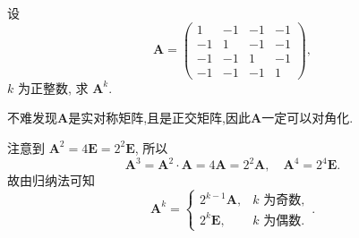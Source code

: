 \documentclass[../../main.tex]{subfiles}%
\begin{document}
\begin{example}
设
\[
\boldsymbol{A} = \begin{pmatrix} 1 & -1 & -1 & -1 \\ -1 & 1 & -1 & -1 \\ -1 & -1 & 1 & -1 \\ -1 & -1 & -1 & 1 \end{pmatrix},
\]
\(k\) 为正整数, 求 \(\boldsymbol{A}^k\).
\end{example}
\begin{remark}
不难发现$\boldsymbol{A}$是实对称矩阵,且是正交矩阵,因此$\boldsymbol{A}$一定可以对角化.
\end{remark}
\begin{solution}

注意到 \(\boldsymbol{A}^2 = 4\boldsymbol{E} = 2^2\boldsymbol{E}\), 所以
\[
\boldsymbol{A}^3 = \boldsymbol{A}^2 \cdot \boldsymbol{A} = 4\boldsymbol{A} = 2^2\boldsymbol{A}, \quad \boldsymbol{A}^4 = 2^4\boldsymbol{E}.
\]
故由归纳法可知
\[
\boldsymbol{A}^k = \begin{cases} 2^{k - 1}\boldsymbol{A}, & k \text{ 为奇数}, \\ 2^k\boldsymbol{E}, & k \text{ 为偶数}. \end{cases}.
\]

\end{solution}
\end{document}
